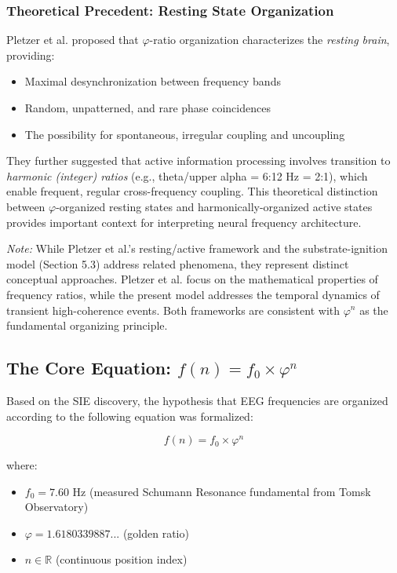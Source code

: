 \documentclass[11pt,a4paper]{article}
\newcommand{\phisym}{\varphi}
\begin{document}
\subsubsection{Theoretical Precedent: Resting State Organization}

Pletzer et al. \parencite{pletzer2010golden} proposed that $\phisym$-ratio organization characterizes the \textit{resting brain}, providing:

\begin{itemize}
    \item Maximal desynchronization between frequency bands
    \item Random, unpatterned, and rare phase coincidences
    \item The possibility for spontaneous, irregular coupling and uncoupling
\end{itemize}

They further suggested that active information processing involves transition to \textit{harmonic (integer) ratios} (e.g., theta/upper alpha = 6:12 Hz = 2:1), which enable frequent, regular cross-frequency coupling. This theoretical distinction between $\phisym$-organized resting states and harmonically-organized active states provides important context for interpreting neural frequency architecture.

\textit{Note:} While Pletzer et al.'s resting/active framework and the substrate-ignition model (Section 5.3) address related phenomena, they represent distinct conceptual approaches. Pletzer et al. focus on the mathematical properties of frequency ratios, while the present model addresses the temporal dynamics of transient high-coherence events. Both frameworks are consistent with $\phisym^n$ as the fundamental organizing principle.

\subsection{The Core Equation: $f(n) = f_0 \times \phisym^n$}

Based on the SIE discovery, the hypothesis that EEG frequencies are organized according to the following equation was formalized:

\begin{keyequation}
\begin{equation}
f(n) = f_0 \times \phisym^n
\label{eq:core}
\end{equation}

where:
\begin{itemize}
    \item $f_0 = 7.60$ Hz (measured Schumann Resonance fundamental from Tomsk Observatory)
    \item $\phisym = 1.6180339887...$ (golden ratio)
    \item $n \in \mathbb{R}$ (continuous position index)
\end{itemize}
\end{keyequation}
\end{document}
